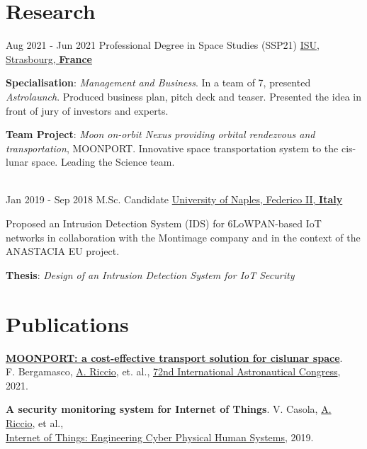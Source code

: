 \documentclass[letterpaper]{twentysecondcv} %
\begin{document}
\section{Research}
\begin{twenty}
	\twentyitem
        {Aug 2021 -}
    	{Jun 2021}
        {Professional Degree in Space Studies (SSP21)}
        {\href{https://www.isunet.edu/ssp/}{ISU, Strasbourg, \textbf{France}}}
        {}
        {
            \vspace{1 mm}
            \textbf{Specialisation}: \textit{Management and Business}. In a team of 7, presented \textit{Astrolaunch}. Produced business plan, pitch deck and teaser. Presented the idea in front of jury of investors and experts.

            \vspace{1 mm}
            \textbf{Team Project}: \textit{Moon on-orbit Nexus providing orbital rendezvous and transportation}, MOONPORT. Innovative space transportation system to the cis-lunar space. Leading the Science team.
        }\\
	\twentyitem
        {Jan 2019 -}
    	{Sep 2018}
        {M.Sc. Candidate}
        {\href{http://www.scuolapsb.unina.it/}{University of Naples, Federico II, \textbf{Italy}}}
        {}
        {
           Proposed an Intrusion Detection System (IDS) for 6LoWPAN-based IoT networks in collaboration with the Montimage company and in the context of the ANASTACIA EU project.

           \vspace{1 mm}
           \textbf{Thesis}: \textit{Design of an Intrusion Detection System for IoT Security}
        }
\end{twenty}

\section{Publications}
    \href{https://www.researchgate.net/publication/355856343_MOONPORT_A_cost-effective_transport_solution_for_cislunar_space}
    {\textbf{MOONPORT: a cost-effective transport solution for cislunar space}}.\\
    F. Bergamasco, \href{https://scholar.google.com/citations?user=A3XqqTEAAAAJ&hl=it}{A. Riccio}, et. al.,
    \href{https://iafastro.directory/iac/paper/id/63931/summary/}
    {72nd International Astronautical Congress}, 2021.

    \textbf{A security monitoring system for Internet of Things}.
    V. Casola,  \href{https://scholar.google.com/citations?user=A3XqqTEAAAAJ&hl=it}{A. Riccio}, et al.,\\
    \href{https://www.researchgate.net/publication/334175322_A_security_monitoring_system_for_Internet_of_Things}
    {Internet of Things: Engineering Cyber Physical Human Systems}, 2019.
\end{document}
